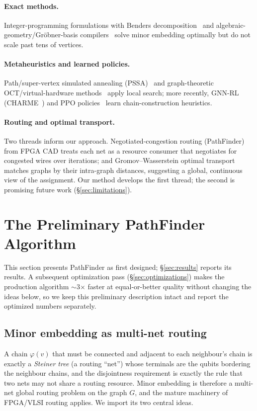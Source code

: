 \documentclass[acmsmall,anonymous,nonacm]{acmart}
\begin{document}
\paragraph{Exact methods.}
Integer-programming formulations with Benders
decomposition~\cite{bernal2020ip} and algebraic-geometry/Gr\"obner-basis
compilers~\cite{dridi2018algebraic} solve minor embedding optimally but do not
scale past tens of vertices.

\paragraph{Metaheuristics and learned policies.}
Path/super-vertex simulated annealing (PSSA)~\cite{sugie2018pssa} and
graph-theoretic OCT/virtual-hardware methods~\cite{goodrich2018oct} apply local
search; more recently, GNN-RL (CHARME~\cite{ngo2024charme}) and PPO
policies~\cite{nembrini2025ppo} learn chain-construction heuristics.

\paragraph{Routing and optimal transport.}
Two threads inform our approach. Negotiated-congestion routing
(PathFinder)~\cite{mcmurchie1995pathfinder} from FPGA CAD treats each net as a
resource consumer that negotiates for congested wires over iterations; and
Gromov--Wasserstein optimal transport~\cite{xu2019gwl,vincentcuaz2022srgw}
matches graphs by their intra-graph distances, suggesting a global, continuous
view of the assignment. Our method develops the first thread; the second is
promising future work (\S\ref{sec:limitations}).

\section{The Preliminary PathFinder Algorithm}
\label{sec:pathfinder}

This section presents PathFinder as first designed; \S\ref{sec:results} reports
its results. A subsequent optimization pass (\S\ref{sec:optimizations}) makes the
production algorithm $\sim$3$\times$ faster at equal-or-better quality without
changing the ideas below, so we keep this preliminary description intact and
report the optimized numbers separately.

\subsection{Minor embedding as multi-net routing}
A chain $\varphi(v)$ that must be connected and adjacent to each neighbour's
chain is exactly a \emph{Steiner tree} (a routing ``net'') whose terminals are
the qubits bordering the neighbour chains, and the disjointness requirement is
exactly the rule that two nets may not share a routing resource. Minor embedding
is therefore a multi-net global routing problem on the graph $G$, and the
mature machinery of FPGA/VLSI routing applies. We import its two central ideas.
\end{document}
